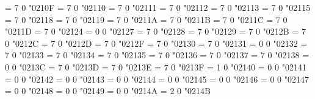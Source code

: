 \Umathchardef\hslash = 7 0 "0210F %
\Umathchardef\mscrI = 7 0 "02110 %
\Umathchardef\Im = 7 0 "02111 %
\Umathchardef\mscrL = 7 0 "02112 %
\Umathchardef\ell = 7 0 "02113 %
\Umathchardef\BbbN = 7 0 "02115 %
\Umathchardef\wp = 7 0 "02118 %
\Umathchardef\BbbP = 7 0 "02119 %
\Umathchardef\BbbQ = 7 0 "0211A %
\Umathchardef\mscrR = 7 0 "0211B %
\Umathchardef\Re = 7 0 "0211C %
\Umathchardef\BbbR = 7 0 "0211D %
\Umathchardef\BbbZ = 7 0 "02124 %
\Umathchardef\mho = 0 0 "02127 %
\Umathchardef\mfrakZ = 7 0 "02128 %
\Umathchardef\turnediota = 7 0 "02129 %
\Umathchardef\Angstrom = 7 0 "0212B %
\Umathchardef\mscrB = 7 0 "0212C %
\Umathchardef\mfrakC = 7 0 "0212D %
\Umathchardef\mscre = 7 0 "0212F %
\Umathchardef\mscrE = 7 0 "02130 %
\Umathchardef\mscrF = 7 0 "02131 %
\Umathchardef\Finv = 0 0 "02132 %
\Umathchardef\mscrM = 7 0 "02133 %
\Umathchardef\mscro = 7 0 "02134 %
\Umathchardef\aleph = 7 0 "02135 %
\Umathchardef\beth = 7 0 "02136 %
\Umathchardef\gimel = 7 0 "02137 %
\Umathchardef\daleth = 7 0 "02138 %
\Umathchardef\Bbbpi = 0 0 "0213C %
\Umathchardef\Bbbgamma = 7 0 "0213D %
\Umathchardef\BbbGamma = 7 0 "0213E %
\Umathchardef\BbbPi = 7 0 "0213F %
\Umathchardef\Bbbsum = 1 0 "02140 %
\Umathchardef\Game = 0 0 "02141 %
\Umathchardef\sansLturned = 0 0 "02142 %
\Umathchardef\sansLmirrored = 0 0 "02143 %
\Umathchardef\Yup = 0 0 "02144 %
\Umathchardef\mitBbbD = 0 0 "02145 %
\Umathchardef\mitBbbd = 0 0 "02146 %
\Umathchardef\mitBbbe = 0 0 "02147 %
\Umathchardef\mitBbbi = 0 0 "02148 %
\Umathchardef\mitBbbj = 0 0 "02149 %
\Umathchardef\PropertyLine = 0 0 "0214A %
\Umathchardef\upand = 2 0 "0214B %
